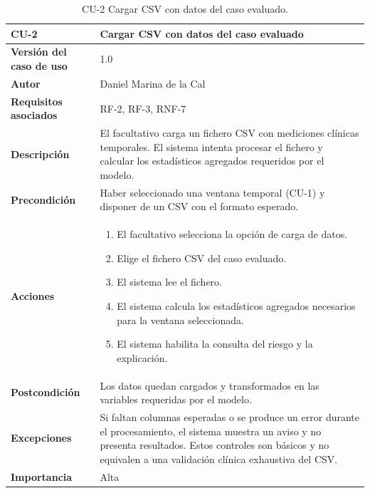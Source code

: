 \documentclass[
  spanish,
  a4paper,
  12pt,
  twoside]{memoir}
\providecommand{\tightlist}{%
  \setlength{\itemsep}{0pt}\setlength{\parskip}{0pt}}
\begin{document}
\begin{table}[p]
    \centering
    \begin{tabularx}{\linewidth}{ p{} p{} }
        \toprule
        \textbf{CU-2} & \textbf{Cargar CSV con datos del caso evaluado}\\
        \toprule
        \textbf{Versión del caso de uso} & 1.0 \\
        \textbf{Autor} & Daniel Marina de la Cal \\
        \textbf{Requisitos asociados} & RF-2, RF-3, RNF-7 \\
        \textbf{Descripción} & El facultativo carga un fichero CSV con mediciones clínicas temporales. El sistema intenta procesar el fichero y calcular los estadísticos agregados requeridos por el modelo. \\
        \textbf{Precondición} & Haber seleccionado una ventana temporal (CU-1) y disponer de un CSV con el formato esperado. \\
        \textbf{Acciones} &
        \begin{enumerate}
            \def\labelenumi{\arabic{enumi}.}
            \tightlist
            \item El facultativo selecciona la opción de carga de datos.
            \item Elige el fichero CSV del caso evaluado.
            \item El sistema lee el fichero.
            \item El sistema calcula los estadísticos agregados necesarios para la ventana seleccionada.
            \item El sistema habilita la consulta del riesgo y la explicación.
        \end{enumerate}\\
        \textbf{Postcondición} & Los datos quedan cargados y transformados en las variables requeridas por el modelo. \\
        \textbf{Excepciones} & Si faltan columnas esperadas o se produce un error durante el procesamiento, el sistema muestra un aviso y no presenta resultados. Estos controles son básicos y no equivalen a una validación clínica exhaustiva del CSV. \\
        \textbf{Importancia} & Alta \\
        \bottomrule
    \end{tabularx}
    \caption{CU-2 Cargar CSV con datos del caso evaluado.}
\end{table}
\end{document}
